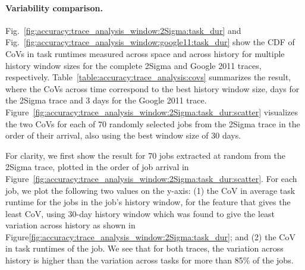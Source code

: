\paragraph{Variability comparison.}
{
Fig.~\ref{fig:accuracy:trace_analysis_window:2Sigma:task_dur} and
Fig.~\ref{fig:accuracy:trace_analysis_window:google11:task_dur} show the CDF of CoVs
in task runtimes measured across space and across history for multiple history
window sizes for the complete 2Sigma and Google 2011 traces, respectively.
Table~\ref{table:accuracy:trace_analysis:covs} summarizes the result,
where the CoVs across time correspond to the best history window size,
 days for the 2Sigma trace and 3 days for
the Google 2011 trace.
}
Figure~\ref{fig:accuracy:trace_analysis_window:2Sigma:task_dur:scatter}
visualizes the two CoVs for each of 70 randomly selected jobs from the 2Sigma trace in the order of
their arrival, also using the best window size of 30 days.

\rm{For clarity, we first show the result for 70 jobs extracted at
random from the 2Sigma trace, plotted in the order of job arrival in
Figure~\ref{fig:accuracy:trace_analysis_window:2Sigma:task_dur:scatter}.
For each job, we plot the following two values on the y-axis:
%
(1) the CoV in average task runtime for the jobs
in the job's history window, for the feature that gives the least CoV,
using 30-day history window which was found to give the least
variation across history as shown in
Figure\ref{fig:accuracy:trace_analysis_window:2Sigma:task_dur}; and
(2) the CoV in task runtimes of the job.  We see that for both traces, the
variation across history is higher than the variation across tasks for more
than 85\% of the jobs.
}

